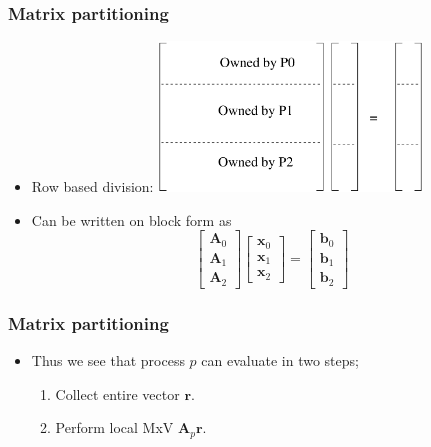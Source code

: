 \documentclass{beamer}
\begin{document}
\begin{frame}\frametitle{Matrix partitioning}
\begin{itemize}
  \item Row based division:
     \includegraphics[width=7cm]{rows}
  \item Can be written on block form as
        \[
           \begin{bmatrix}
                \mathbf{A}_0 \\
                \mathbf{A}_1 \\
                \mathbf{A}_2
           \end{bmatrix}\begin{bmatrix}
                          \mathbf{x}_0 \\
                          \mathbf{x}_1 \\
                          \mathbf{x}_2
                        \end{bmatrix} = \begin{bmatrix}
                                          \mathbf{b}_0 \\
                                          \mathbf{b}_1 \\
                                          \mathbf{b}_2
                                        \end{bmatrix}
        \]
\end{itemize}
\end{frame}
\begin{frame}\frametitle{Matrix partitioning}
\begin{itemize}
  \item Thus we see that process $p$ can evaluate in two steps;
  \begin{enumerate}
    \item Collect entire vector $\mathbf{r}$.
    \item Perform local MxV $\mathbf{A}_p \mathbf{r}$.
  \end{enumerate}
\end{itemize}
\end{frame}
\end{document}
